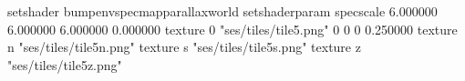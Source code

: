 setshader bumpenvspecmapparallaxworld
setshaderparam specscale 6.000000 6.000000 6.000000 0.000000
texture 0 "ses/tiles/tile5.png" 0 0 0 0.250000
texture n "ses/tiles/tile5n.png"
texture s "ses/tiles/tile5s.png"
texture z "ses/tiles/tile5z.png"

